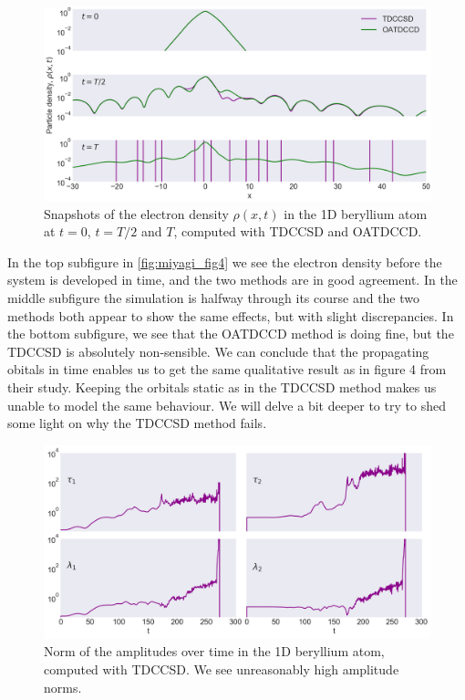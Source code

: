 \begin{figure}
    \centering
    \includegraphics[width=\textwidth]{results/figures/miyagi/fig4_miqyagi.png} 
    \caption{Snapshots of the electron density $\rho(x, t)$ in the 1D beryllium atom 
        at $t=0$, $t=T/2$ and $T$, computed with TDCCSD and OATDCCD. 
    }
    \label{fig:miyagi_fig4}
\end{figure}

In the top subfigure in \autoref{fig:miyagi_fig4} we see the electron density before 
the system is developed in time, and the two methods are in good agreement. In 
the middle subfigure the simulation is halfway through its course and the two methods
both appear to show the same effects, but with 
slight discrepancies. In the bottom subfigure, we see that the OATDCCD method is doing
fine, but the TDCCSD is absolutely non-sensible. We can conclude that the propagating 
obitals in time enables us to get the same qualitative result as \citeauthor{miyagi2013time}
in figure 4 from their study. Keeping the orbitals static as in the TDCCSD method makes 
us unable to model the same behaviour. We will delve a bit deeper to try to shed 
some light on why the TDCCSD method fails.

\begin{figure}
    \centering
    \includegraphics[width=\textwidth]{results/figures/miyagi/amplitude_norm_tdccsd.png} 
    \caption{Norm of the amplitudes over time in the 1D beryllium atom, computed 
        with TDCCSD. We see unreasonably high amplitude norms.
    }
    \label{fig:miyagi_tddccsd_amplitude}
\end{figure}

